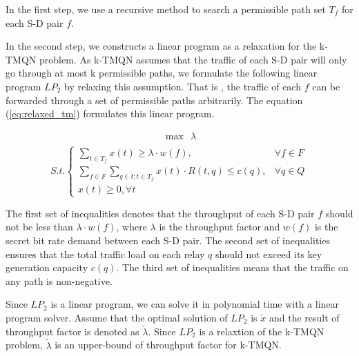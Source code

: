 In the first step, we use a recursive method to search a permissible path set $T_f$ for each S-D pair $f$.

In the second step, we constructs a linear program as a relaxation for the k-TMQN problem. As k-TMQN assumes that the traffic of each S-D pair will only go through at most k permissible paths, we formulate the following linear program $LP_2$ by relaxing this assumption. That is , the traffic of each $f$ can be forwarded through a set of permissible paths arbitrarily. The equation (\ref{eq:relaxed_tm}) formulates this linear program.

 \begin{equation*}
 \begin{aligned}
 \max \ \ \lambda \\
 \end{aligned}
 \end{equation*}
 \begin{equation}\label{eq:relaxed_tm}
 S.t.\begin{cases}
 \sum_{t \in T_f} x(t) \ge \lambda \cdot w(f), & \forall f \in F \\
 \sum_{f \in F}\sum_{q \in t:t \in T_f}{x(t) \cdot R(t,q)} \le c(q), & \forall q \in Q \\
	x(t) \ge 0, \forall t
 
 
 \end{cases}
 \end{equation}
 
The first set of inequalities denotes that the throughput of each S-D pair $f$ should not be less than $\lambda \cdot w(f)$, where $\lambda$ is the throughput factor and $w(f)$ is the secret bit rate demand between each S-D pair. The second set of inequalities ensures that the total traffic load on each relay $q$ should not exceed its key generation capacity $c(q)$. The third set of inequalities means that the traffic on any path is non-negative.


Since $LP_2$ is a linear program, we can solve it in polynomial time with a linear program solver. Assume that the optimal solution of $LP_2$ is $\widetilde{x}$ and the result of throughput factor is denoted as $\widetilde{\lambda}$. Since $LP_2$ is a relaxtion of the k-TMQN problem, $\widetilde{\lambda}$ is an upper-bound of throughput factor for k-TMQN. 

